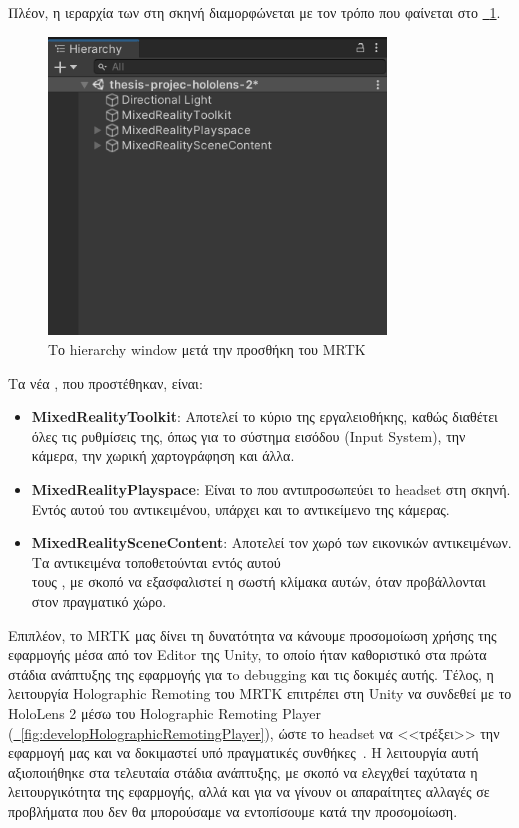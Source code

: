 Πλέον, η ιεραρχία των  στη σκηνή διαμορφώνεται με τον τρόπο που φαίνεται στο \hyperref[fig:developHierarchyMRTK]{\schema~\ref*{fig:developHierarchyMRTK}}.

\begin{figure}[!h]
    \centering
    \includegraphics[width=0.8\textwidth]{images/develop_hierarchyAfterMRTK.png}
    \caption{Το hierarchy window μετά την προσθήκη του MRTK}\label{fig:developHierarchyMRTK}
\end{figure}

Τα νέα , που προστέθηκαν, είναι:
\begin{itemize}
    \item \textbf{MixedRealityToolkit}: Αποτελεί το κύριο  της εργαλειοθήκης, καθώς διαθέτει όλες τις ρυθμίσεις της, όπως για το σύστημα εισόδου (Input System), την κάμερα, την χωρική χαρτογράφηση και άλλα.
    \item \textbf{MixedRealityPlayspace}: Είναι το  που αντιπροσωπεύει το headset στη σκηνή. Εντός αυτού του αντικειμένου, υπάρχει και το αντικείμενο της κάμερας.
    \item \textbf{MixedRealitySceneContent}: Αποτελεί τον χωρό των εικονικών αντικειμένων. Τα αντικειμένα τοποθετούνται εντός αυτού\\
    τους , με σκοπό να εξασφαλιστεί η σωστή κλίμακα αυτών, όταν προβάλλονται στον πραγματικό χώρο.
\end{itemize}

Επιπλέον, το MRTK μας δίνει τη δυνατότητα να κάνουμε προσομοίωση χρήσης της εφαρμογής μέσα από τον Editor της Unity, το οποίο ήταν καθοριστικό στα πρώτα στάδια ανάπτυξης της εφαρμογής για τo debugging και τις δοκιμές αυτής. Τέλος, η λειτουργία Holographic Remoting του MRTK επιτρέπει στη Unity να συνδεθεί με το HoloLens 2 μέσω του Holographic Remoting Player (\hyperref[fig:developHolographicRemotingPlayer]{\schema~\ref*{fig:developHolographicRemotingPlayer}}), ώστε το headset να <<τρέξει>> την εφαρμογή μας και να δοκιμαστεί υπό πραγματικές συνθήκες~\cite{florianbagarmicrosoft_2023_holographic}. Η λειτουργία αυτή αξιοποιήθηκε στα τελευταία στάδια ανάπτυξης, με σκοπό να ελεγχθεί ταχύτατα η λειτουργικότητα της εφαρμογής, αλλά και για να γίνουν οι απαραίτητες αλλαγές σε προβλήματα που δεν θα μπορούσαμε να εντοπίσουμε κατά την προσομοίωση.

